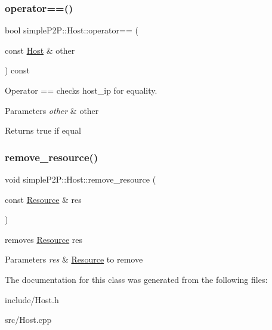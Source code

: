 \subsubsection{\texorpdfstring{operator==()}{operator==()}}
{\footnotesize\ttfamily bool simple\+P2\+P\+::\+Host\+::operator== (\begin{DoxyParamCaption}\item[{const \hyperlink{classsimpleP2P_1_1Host}{Host} \&}]{other }\end{DoxyParamCaption}) const}



Operator == checks host\+\_\+ip for equality. 


\begin{DoxyParams}{Parameters}
{\em other} & other \\
\hline
\end{DoxyParams}
\begin{DoxyReturn}{Returns}
true if equal 
\end{DoxyReturn}
\mbox{\label{classsimpleP2P_1_1Host_acbe80ca99357b13ea06a56040bbd630f}} 
\subsubsection{\texorpdfstring{remove\+\_\+resource()}{remove\_resource()}}
{\footnotesize\ttfamily void simple\+P2\+P\+::\+Host\+::remove\+\_\+resource (\begin{DoxyParamCaption}\item[{const \hyperlink{classsimpleP2P_1_1Resource}{Resource} \&}]{res }\end{DoxyParamCaption})}



removes \hyperlink{classsimpleP2P_1_1Resource}{Resource} res 


\begin{DoxyParams}{Parameters}
{\em res} & \hyperlink{classsimpleP2P_1_1Resource}{Resource} to remove \\
\hline
\end{DoxyParams}


The documentation for this class was generated from the following files\+:\begin{DoxyCompactItemize}
\item 
include/Host.\+h\item 
src/Host.\+cpp\end{DoxyCompactItemize}
